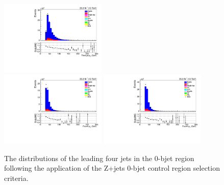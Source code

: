 \begin{figure}[!ht]
\includegraphics[width=0.45\textwidth]{figs/background-estimation/plots/unblinded/DY_control_old_prompt_mumu_ttbarInc/thirdJetPt_SingleTop_jetSel_mumu.pdf}
\\
\includegraphics[width=0.45\textwidth]{figs/background-estimation/plots/unblinded/DY_control_old_prompt_ee_ttbarInc/fourthJetPt_SingleTop_jetSel_ee.pdf}
\includegraphics[width=0.45\textwidth]{figs/background-estimation/plots/unblinded/DY_control_old_prompt_mumu_ttbarInc/fourthJetPt_SingleTop_jetSel_mumu.pdf}
\caption{
The distributions of the leading four jets \pt in the 0-bjet region following the application of the Z+jets 0-bjet control region selection criteria.
}
\label{fig:CR_LO_jetPt_jetSel}
\end{figure}

